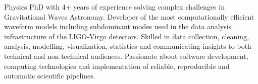 
\begin{cvpubs}
  \cvpub
    {
      \begin{cvlist}
  \item {Physics PhD with 4+ years of experience solving complex challenges in Gravitational Waves Astronomy. Developer of the most computationally efficient waveform models including subdominant modes used in the data analysis infrastructure of the LIGO-Virgo detectors. Skilled in data collection, cleaning, analysis, modelling, visualization, statistics and communicating insights to both technical and non-technical audiences. Passionate about software development, computing technologies and implementation of reliable, reproducible and automatic scientific pipelines.}
      \end{cvlist}
    }
\end{cvpubs}%

